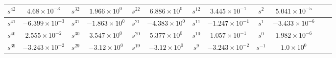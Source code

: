 \documentclass{article}
\begin{document}
\begin{table}[H]
\begin{adjustwidth}{-4.1cm}{}
\begin{tabular}{|c|c|c|c|c|c|c|c|c|c|c|c|}
\hline
$s^{ 42 }$ & $ 4.68 \times 10^{ -3 }$ & $s^{ 32 }$ & $ 1.966 \times 10^{ 0 }$ & $s^{ 22 }$ & $ 6.886 \times 10^{ 0 }$  & $s^{ 12 }$ & $ 3.445 \times 10^{ -1 }$ & $s^{ 2 }$ & $ 5.041 \times 10^{ -5 }$ \\
\hline
$s^{ 41 }$ & $ -6.399 \times 10^{ -3 }$ & $s^{ 31 }$ & $ -1.863 \times 10^{ 0 }$ & $s^{ 21 }$ & $ -4.383 \times 10^{ 0 }$  & $s^{ 11 }$ & $ -1.247 \times 10^{ -1 }$ & $s^{ 1 }$ & $ -3.433 \times 10^{ -6 }$ \\
\hline
$s^{ 40 }$ & $ 2.555 \times 10^{ -2 }$ & $s^{ 30 }$ & $ 3.547 \times 10^{ 0 }$ & $s^{ 20 }$ & $ 5.377 \times 10^{ 0 }$  & $s^{ 10 }$ & $ 1.057 \times 10^{ -1 }$ & $s^{ 0 }$ & $ 1.982 \times 10^{ -6 }$ \\
\hline
$s^{ 39 }$ & $ -3.243 \times 10^{ -2 }$ & $s^{ 29 }$ & $ -3.12 \times 10^{ 0 }$ & $s^{ 19 }$ & $ -3.12 \times 10^{ 0 }$  & $s^{ 9 }$ & $ -3.243 \times 10^{ -2 }$ & $s^{ -1 }$ & $ 1.0 \times 10^{ 0 }$ \\
\hline
  	\end{tabular}
	\end{adjustwidth}
\end{table}
\end{document}
